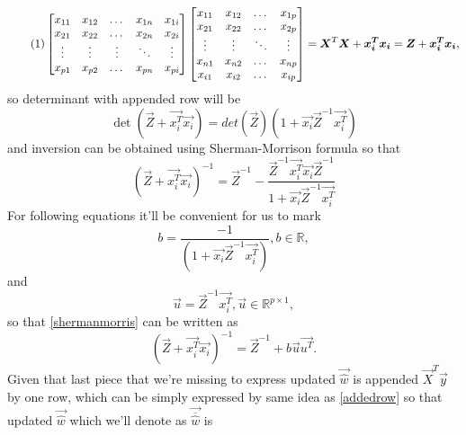 \[ \numberthis \label{addedrow}
\begin{bmatrix}
    x_{11} & x_{12} & \dots  & x_{1n} & x_{1i}  \\
    x_{21} & x_{22} & \dots  & x_{2n} & x_{2i} \\
    \vdots & \vdots & \vdots & \ddots & \vdots \\
    x_{p1} & x_{p2} & \dots  & x_{pn} & x_{pi}     
\end{bmatrix}
\begin{bmatrix}
    x_{11} & x_{12}  & \dots  & x_{1p} \\
    x_{21} & x_{22}  & \dots  & x_{2p} \\
    \vdots  & \vdots & \ddots & \vdots \\
    x_{n1} & x_{n2}  & \dots  & x_{np} \\
    x_{i1} & x_{i2}  & \dots  & x_{ip}
\end{bmatrix}
 = \vec{X}^T\vec{X} + \vec{x_i^T}\vec{x_i} = \vec{Z} + \vec{x_i^T}\vec{x_i},
\]
so determinant with appended row will be
\begin{equation} \label{udpateddeterminant}
    \det(\vec{Z} + \vec{x_i^T}\vec{x_i}) = det(\vec{Z})(1 + \vec{x_i}\vec{Z}^{-1}\vec{x_i^T})
\end{equation}
and inversion can be obtained using Sherman-Morrison formula \cite{bartlett1951inverse} so that 
\begin{equation} \label{shermanmorris}
    (\vec{Z} + \vec{x_i^T}\vec{x_i})^{-1} = \vec{Z}^{-1} - \dfrac{\vec{Z}^{-1}\vec{x_i^T}\vec{x_i}\vec{Z}^{-1}}{1 + \vec{x_i}\vec{Z}^{-1}\vec{x_i^T}}
\end{equation}
For following equations it'll be convenient for us to mark 
\begin{equation}
    b = \dfrac{-1}{(1 + \vec{x_i}\vec{Z}^{-1}\vec{x_i^T})},  b \in \mathbb{R},
\end{equation}
and 
\begin{equation} \label{agullo_u}
    \vec{u} = \vec{Z}^{-1}\vec{x_i^T},      \vec{u} \in \mathbb{R}^{p \times 1},
\end{equation}
so that \ref{shermanmorris} can be written as
\begin{equation} \label{inversionplus}
    (\vec{Z} + \vec{x_i^T}\vec{x_i})^{-1} = \vec{Z}^{-1} + b\vec{u}\vec{u^T}.
\end{equation}
Given that last piece that we're missing to express updated $\vec{\hat{w}}$ is appended $\vec{X}^T\vec{y}$ by one row, which can be simply expressed by same idea as \ref{addedrow} so that updated $\vec{\hat{w}}$ which we'll denote as $\vec{\overline{\hat{w}}}$ is 
